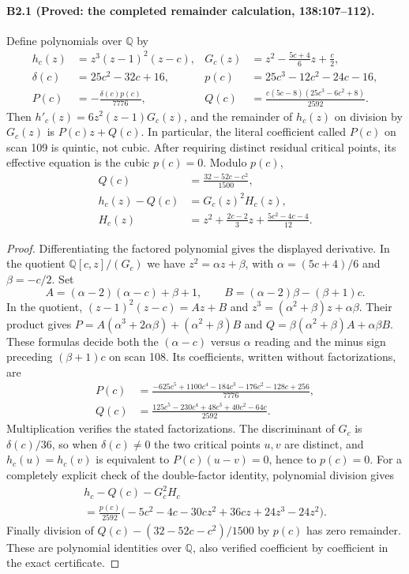 \paragraph{B2.1 (Proved: the completed remainder calculation, 138:107--112).}
Define polynomials over $\mathbb Q$ by
\begin{align*}
 h_c(z)&=z^3(z-1)^2(z-c),&
 G_c(z)&=z^2-\frac{5c+4}{6}z+\frac c2,\\
 \delta(c)&=25c^2-32c+16,&
 p(c)&=25c^3-12c^2-24c-16,\\
 P(c)&=-\frac{\delta(c)p(c)}{7776},&
 Q(c)&=\frac{c(5c-8)(25c^3-6c^2+8)}{2592}.
\end{align*}
Then $h'_c(z)=6z^2(z-1)G_c(z)$, and the remainder of $h_c(z)$
on division by $G_c(z)$ is $P(c)z+Q(c)$. In particular, the literal
coefficient called $P(c)$ on scan 109 is quintic, not cubic.
After requiring distinct residual critical points, its effective
equation is the cubic $p(c)=0$. Modulo $p(c)$,
\begin{align}
 Q(c)&=\frac{32-52c-c^2}{1500},\label{eq:B2Q}\\
 h_c(z)-Q(c)&=G_c(z)^2H_c(z),\label{eq:B2factor}\\
 H_c(z)&=z^2+\frac{2c-2}{3}z+\frac{5c^2-4c-4}{12}.\nonumber
\end{align}

\begin{proof}
Differentiating the factored polynomial gives the displayed derivative.
In the quotient $\mathbb Q[c,z]/(G_c)$ we have
$z^2=\alpha z+\beta$, with
$\alpha=(5c+4)/6$ and $\beta=-c/2$.
Set
\[
 A=(\alpha-2)(\alpha-c)+\beta+1,
 \qquad B=(\alpha-2)\beta-(\beta+1)c.
\]
In the quotient, $(z-1)^2(z-c)=Az+B$ and
$z^3=(\alpha^2+\beta)z+\alpha\beta$. Their product gives
$P=A(\alpha^3+2\alpha\beta)+(\alpha^2+\beta)B$ and
$Q=\beta(\alpha^2+\beta)A+\alpha\beta B$.
These formulas decide both the $(\alpha-c)$ versus $\alpha$ reading
and the minus sign preceding $(\beta+1)c$ on scan 108.
Its coefficients,
written without factorizations, are
\begin{align*}
 P(c)&=\frac{-625c^5+1100c^4-184c^3-176c^2-128c+256}{7776},\\
 Q(c)&=\frac{125c^5-230c^4+48c^3+40c^2-64c}{2592}.
\end{align*}
Multiplication verifies the stated factorizations. The discriminant of
$G_c$ is $\delta(c)/36$, so when $\delta(c)\ne0$ the two critical
points $u,v$ are distinct, and
$h_c(u)=h_c(v)$ is equivalent to $P(c)(u-v)=0$, hence to $p(c)=0$.
For a completely explicit check of the double-factor identity, polynomial
division gives
\begin{multline*}
 h_c-Q(c)-G_c^2H_c\\
 =\frac{p(c)}{2592}
 \bigl(-5c^2-4c-30cz^2+36cz+24z^3-24z^2\bigr).
\end{multline*}
Finally division of $Q(c)-(32-52c-c^2)/1500$ by $p(c)$ has zero
remainder. These are polynomial identities over $\mathbb Q$, also
verified coefficient by coefficient in the exact certificate.
\end{proof}

